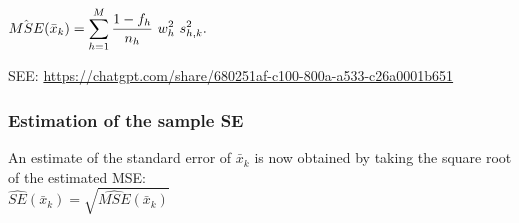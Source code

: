 $
    \hat{MSE} (\bar{x}_k )
    = \displaystyle\sum^M_{h=1} \dfrac{1 - f_h}{n_h} \ w^2_h\ s^2_{h,k}.
$
\hfill \cite{statistics/book/Statistics-for-Data-Scientists/Maurits-Kaptein}

SEE: \url{https://chatgpt.com/share/680251af-c100-800a-a533-c26a0001b651}

\subsubsection{Estimation of the sample SE}

An estimate of the standard error of $\bar{x}_k$ is now obtained by taking the square root of
the estimated MSE:
\hfill \cite{statistics/book/Statistics-for-Data-Scientists/Maurits-Kaptein}
\\
$
    \hat{SE}(\bar{x}_k) = \sqrt{\hat{MSE} (\bar{x}_k )}
$












